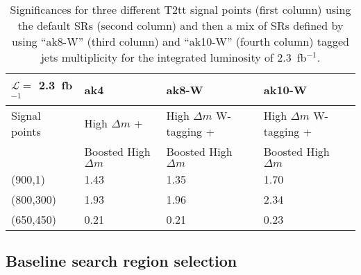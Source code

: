 \begin{table}[h]
\begin{center}
\begin{tabular}{|l|l|l|l|}
\hline
$\mathcal{L} =$ 2.3~fb$^{-1}$             & ak4~\cite{Sirunyan:2017xse}      & ak8-W & ak10-W \\
\hline
Signal points                       & High $\Delta m$ +           &  High $\Delta m$ W-tagging +  &   High $\Delta m$ W-tagging +  \\
                       &  Boosted High $\Delta m$    & Boosted High $\Delta m$       &   Boosted High $\Delta m$  \\
\hline
\hline
(900,1) &     1.43 & 1.35 & 1.70  \\
\hline
(800,300) &   1.93 & 1.96 & 2.34  \\
\hline
(650,450) &   0.21 & 0.21 & 0.23  \\
\hline
\end{tabular}
\caption[Table caption text]{ Significances for three different T2tt signal points (first column) using the default SRs (second column) and then a mix of SRs defined by using ``ak8-W'' (third column) and ``ak10-W'' (fourth column) tagged jets multiplicity for the integrated luminosity of 2.3~fb$^{-1}$. }
\label{tab:taggingResults}
\end{center}
\end{table}





\subsection{Baseline search region selection~\label{sec:baseline}}

